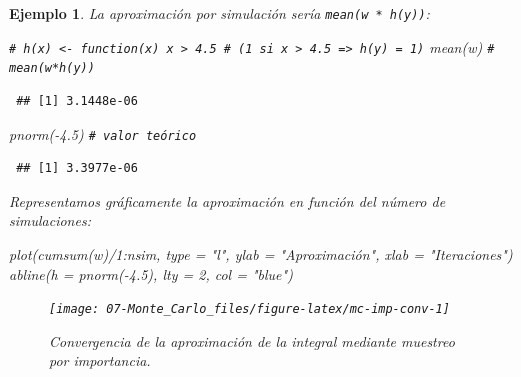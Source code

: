 \documentclass[
  10pt,
]{book}
\newenvironment{Shaded}{\begin{snugshade}}{\end{snugshade}}
\newcommand{\AttributeTok}[1]{\textcolor[rgb]{0.77,0.63,0.00}{#1}}
\newcommand{\CommentTok}[1]{\textcolor[rgb]{0.56,0.35,0.01}{\textit{#1}}}
\newcommand{\DecValTok}[1]{\textcolor[rgb]{0.00,0.00,0.81}{#1}}
\newcommand{\FloatTok}[1]{\textcolor[rgb]{0.00,0.00,0.81}{#1}}
\newcommand{\FunctionTok}[1]{\textcolor[rgb]{0.00,0.00,0.00}{#1}}
\newcommand{\NormalTok}[1]{#1}
\newcommand{\SpecialCharTok}[1]{\textcolor[rgb]{0.00,0.00,0.00}{#1}}
\newcommand{\StringTok}[1]{\textcolor[rgb]{0.31,0.60,0.02}{#1}}
\theoremstyle{break}
\newtheorem{example}{Ejemplo}[chapter]
\theoremstyle{nonumberplain}
\renewcommand{\CommentTok}[1]{\textcolor[rgb]{0.41,0.41,0.41}{\texttt{#1}}}
\begin{document}
\begin{example}
La aproximación por simulación sería \texttt{mean(w\ *\ h(y))}:

\begin{Shaded}
\begin{Highlighting}[]
\CommentTok{\# h(x) \textless{}{-} function(x) x \textgreater{} 4.5  \# (1 si x \textgreater{} 4.5 =\textgreater{} h(y) = 1)}
\FunctionTok{mean}\NormalTok{(w) }\CommentTok{\# mean(w*h(y))}
\end{Highlighting}
\end{Shaded}

\begin{verbatim}
 ## [1] 3.1448e-06
\end{verbatim}

\begin{Shaded}
\begin{Highlighting}[]
\FunctionTok{pnorm}\NormalTok{(}\SpecialCharTok{{-}}\FloatTok{4.5}\NormalTok{)  }\CommentTok{\# valor teórico}
\end{Highlighting}
\end{Shaded}

\begin{verbatim}
 ## [1] 3.3977e-06
\end{verbatim}

Representamos gráficamente la aproximación en función del número de simulaciones:

\begin{Shaded}
\begin{Highlighting}[]
\FunctionTok{plot}\NormalTok{(}\FunctionTok{cumsum}\NormalTok{(w)}\SpecialCharTok{/}\DecValTok{1}\SpecialCharTok{:}\NormalTok{nsim, }\AttributeTok{type =} \StringTok{"l"}\NormalTok{, }\AttributeTok{ylab =} \StringTok{"Aproximación"}\NormalTok{, }\AttributeTok{xlab =} \StringTok{"Iteraciones"}\NormalTok{)}
\FunctionTok{abline}\NormalTok{(}\AttributeTok{h =} \FunctionTok{pnorm}\NormalTok{(}\SpecialCharTok{{-}}\FloatTok{4.5}\NormalTok{), }\AttributeTok{lty =} \DecValTok{2}\NormalTok{, }\AttributeTok{col =} \StringTok{"blue"}\NormalTok{)}
\end{Highlighting}
\end{Shaded}

\begin{figure}[!htbp]

{\centering \texttt{[image: 07-Monte\_Carlo\_files/figure-latex/mc-imp-conv-1]} 

}

\caption{Convergencia de la aproximación de la integral mediante muestreo por importancia.}\label{fig:mc-imp-conv}
\end{figure}


\end{example}
\end{document}
